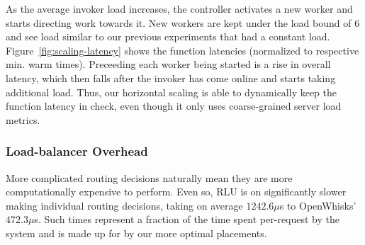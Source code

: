 As the average invoker load increases, the controller activates a new worker and starts directing work towards it.
New workers are kept under the load bound of 6 and see load similar to our previous experiments that had a constant load.
Figure~\ref{fig:scaling-latency} shows the function latencies (normalized to respective min. warm times). %
Preceeding each worker being started is a rise in overall latency, which then falls after the invoker has come online and starts taking additional load.
Thus, our horizontal scaling is able to dynamically keep the function latency in check, even though it only uses coarse-grained server load metrics.


\subsubsection{Load-balancer Overhead}


More complicated routing decisions naturally mean they are more computationally expensive to perform.
Even so, RLU is on significantly slower making individual routing decisions, taking on average $1242.6 \mu$s to OpenWhisks' $472.3 \mu$s.
Such times represent a fraction of the time spent per-request by the system and is made up for by our more optimal placements. 
